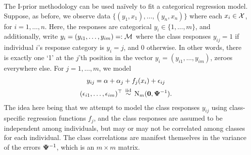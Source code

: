 The I-prior methodology can be used naïvely to fit a categorical regression model.
Suppose, as before, we observe data $\{(y_1,x_1),\dots,(y_n,x_n) \}$ where each $x_i \in {\mathcal X}$, for $i=1,\dots,n$.
Here, the responses are categorical $y_i \in \{ 1,\dots,m \}$, and additionally, write $y_i = (y_{i1},\dots,y_{im}) =: 
{\mathcal M}$ where the class responses $y_{ij} = 1$ if individual $i$'s response category is $y_i = j$, and 0 otherwise.
In other words, there is exactly one `1' at the $j$'th position in the vector $y_i = (y_{i1},\dots,y_{im})$, zeroes everywhere else.
For $j=1,\dots,m$, we model 
\begin{equation}\label{eq:naiveclassmod}
  \begin{gathered}
    y_{ij} = \alpha + \alpha_j + f_j(x_i) + \epsilon_{ij}  \\
    (\epsilon_{i1},\dots,\epsilon_{im})^\top \,\overset{\text{iid}}{\sim}\, \operatorname{N}_m({\mathbf 0},{\bm\Psi}^{-1}).
  \end{gathered}
\end{equation}
The idea here being that we attempt to model the class responses $y_{ij}$ using class-specific regression functions $f_j$, and the class responses are assumed to be independent among individuals, but may or may not be correlated among classes for each individual.
The class correlations are manifest themselves in the variance of the errors ${\bm\Psi}^{-1}$, which is an $m\times m$ matrix.

